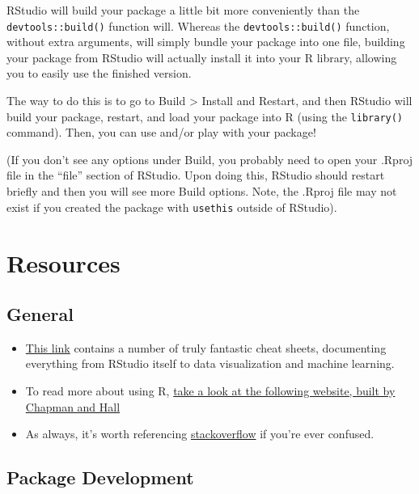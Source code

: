 \documentclass[
]{book}
\providecommand{\tightlist}{%
  \setlength{\itemsep}{0pt}\setlength{\parskip}{0pt}}
\begin{document}
RStudio will build your package a little bit more conveniently than the \texttt{devtools::build()} function will. Whereas the \texttt{devtools::build()} function, without extra arguments, will simply bundle your package into one file, building your package from RStudio will actually install it into your R library, allowing you to easily use the finished version.

The way to do this is to go to Build \textgreater{} Install and Restart, and then RStudio will build your package, restart, and load your package into R (using the \texttt{library()} command). Then, you can use and/or play with your package!

(If you don't see any options under Build, you probably need to open your .Rproj file in the ``file'' section of RStudio. Upon doing this, RStudio should restart briefly and then you will see more Build options. Note, the .Rproj file may not exist if you created the package with \texttt{usethis} outside of RStudio).

\hypertarget{resources}{%
\chapter{Resources}\label{resources}}

\hypertarget{general}{%
\section{General}\label{general}}

\begin{itemize}
\tightlist
\item
  \href{https://www.rstudio.com/resources/cheatsheets/}{This link} contains a number of truly fantastic cheat sheets, documenting everything from RStudio itself to data visualization and machine learning.
\item
  To read more about using R, \href{http://adv-r.had.co.nz/}{take a look at the following website, built by Chapman and Hall}
\item
  As always, it's worth referencing \href{https://stackoverflow.com/questions/tagged/r/}{stackoverflow} if you're ever confused.
\end{itemize}

\hypertarget{package-development-1}{%
\section{Package Development}\label{package-development-1}}
\end{document}
